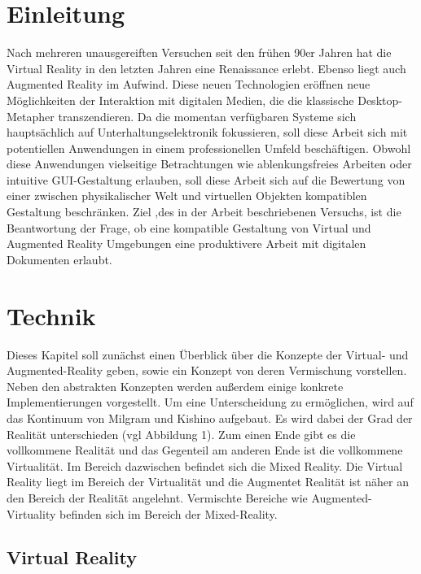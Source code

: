 \documentclass[12pt,a4paper,bibliography=totocnumbered,listof=totocnumbered]{scrartcl}
\begin{document}
\section{Einleitung}
Nach mehreren unausgereiften Versuchen seit den frühen 90er Jahren hat die Virtual Reality in den letzten Jahren eine Renaissance erlebt. Ebenso liegt auch Augmented Reality im Aufwind. Diese neuen Technologien eröffnen neue Möglichkeiten der Interaktion mit digitalen Medien, die die klassische Desktop-Metapher transzendieren.
Da die momentan verfügbaren Systeme sich hauptsächlich auf Unterhaltungselektronik fokussieren, soll diese Arbeit sich mit potentiellen Anwendungen in einem professionellen Umfeld beschäftigen.
Obwohl diese Anwendungen vielseitige Betrachtungen wie ablenkungsfreies Arbeiten oder intuitive GUI-Gestaltung erlauben, soll diese Arbeit sich auf die Bewertung von einer zwischen physikalischer Welt und virtuellen Objekten kompatiblen Gestaltung beschränken.
Ziel ,des in der Arbeit beschriebenen Versuchs, ist die Beantwortung der Frage, ob eine kompatible Gestaltung von Virtual und Augmented Reality Umgebungen eine produktivere Arbeit mit digitalen Dokumenten erlaubt.
\section{Technik}
Dieses Kapitel soll zunächst einen Überblick über die Konzepte der Virtual- und Augmented-Reality geben, sowie ein Konzept von deren Vermischung vorstellen. Neben den abstrakten Konzepten werden außerdem einige konkrete Implementierungen vorgestellt.  Um eine Unterscheidung zu ermöglichen, wird auf das Kontinuum von Milgram und Kishino aufgebaut. Es wird dabei der Grad der Realität unterschieden (vgl Abbildung 1). Zum einen Ende gibt es die vollkommene Realität und das Gegenteil am anderen Ende ist die vollkommene Virtualität. Im Bereich dazwischen befindet sich die Mixed Reality. Die Virtual Reality liegt im Bereich der Virtualität und die Augmentet Realität ist näher an den Bereich der Realität angelehnt. Vermischte Bereiche wie Augmented-Virtuality befinden sich im Bereich der Mixed-Reality.
\subsection{Virtual Reality}
\end{document}
